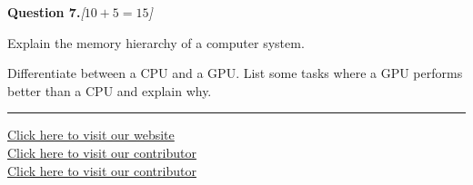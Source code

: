\documentclass[11pt,a4paper]{article}
\newcommand{\pts}[1]{\hfill   \textit{[#1]}}
\begin{document}
\bigskip




\noindent   \textbf{Question 7.}\pts{$10+5=15$}

\begin{parts}
  \item Explain the memory hierarchy of a computer system.
  \item Differentiate between a CPU and a GPU. List some tasks where a GPU performs better than a CPU and explain why.
\end{parts}

\vfill
\rule{\linewidth}{0.4pt}

\begin{center}\small
\href{https://bhu-exam.vercel.app/}{Click here to visit our website}\\[4pt]\href{https://me-aryan.vercel.app/}{Click here to visit our contributor}\\[4pt]\href{https://quashan-me.vercel.app/}{Click here to visit our contributor}
\end{center}
\end{document}
